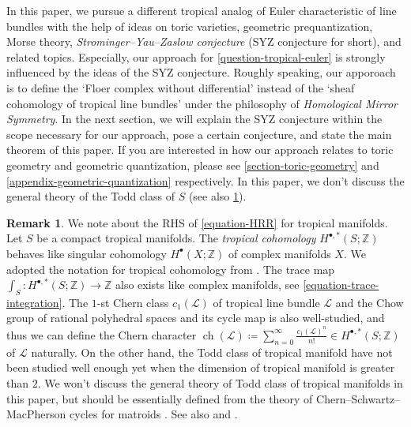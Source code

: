 \documentclass[a4paper,dvipdfmx,reqno,12pt]{amsart}
\theoremstyle{definition}
\newtheorem{remark}[theorem]{Remark}
\newcommand{\deq}{\coloneqq}
\newcommand{\opn}[1]{\operatorname{#1}}
\numberwithin{equation}{section}
\begin{document}
In this paper, we pursue a different tropical
analog of Euler characteristic of line bundles with the help of 
ideas on toric varieties, geometric prequantization,
Morse theory, \emph{Strominger--Yau--Zaslow conjecture}
(SYZ conjecture for short), and related topics.
Especially, our approach for 
\cref{question-tropical-euler} is 
strongly influenced by the ideas of the SYZ conjecture.
Roughly speaking, our apporoach is to define
the `Floer complex without differential' instead 
of the `sheaf cohomology of tropical line bundles' 
under the philosophy of \emph{Homological Mirror 
Symmetry}. 
In the next section, we will explain the SYZ conjecture 
within the scope necessary for our approach, 
pose a certain conjecture,
and state the main theorem of this paper.
If you are interested in how our approach 
relates to toric geometry and geometric quantization, 
please see \cref{section-toric-geometry} and 
\cref{appendix-geometric-quantization} respectively.
In this paper, we don't discuss the general theory of 
the Todd class of $S$
(see also \cref{remark-todd-class}).
\begin{remark}
\label{remark-todd-class}
We note about the RHS of \cref{equation-HRR} 
for tropical manifolds.
Let $S$ be a compact tropical manifolds.
The \emph{tropical cohomology}
$H^{\bullet,*}(S;\mathbb{Z})$ 
\cite{mikhalkinTropicalEigenwaveIntermediate2014a,
itenbergTropicalHomology2019b}
behaves like singular cohomology 
$H^{\bullet}(X;\mathbb{Z})$ 
of complex manifolds $X$.
We adopted the notation for tropical cohomology 
from \cite[Definition 2.6]{MR3894860}. 
The trace map 
$\int_S\colon H^{\bullet,*}(S;\mathbb{Z})
\to \mathbb{Z}$ also exists like 
complex manifolds, see 
\cref{equation-trace-integration}.  
The $1$-st Chern class $c_1(\mathcal{L})$ of 
tropical line bundle $\mathcal{L}$ and 
the Chow group of rational polyhedral spaces and 
its cycle map is also 
well-studied,
and thus we can define the Chern character
$\opn{ch}(\mathcal{L})\deq 
\sum_{n=0}^{\infty}\frac{c_1(\mathcal{L})^{n}}{n!}
\in H^{\bullet,*}(S;\mathbb{Z})$ of 
$\mathcal{L}$ naturally.
On the other hand, the Todd class of tropical manifold
have not been studied well enough yet  
when the dimension of tropical manifold is greater
than $2$.
We won't discuss the general theory of Todd class of tropical 
manifolds in this paper, 
but should be essentially defined from the theory of 
Chern--Schwartz--MacPherson cycles for matroids 
\cite[Previous work]{lopezdemedranoChernSchwartzMacPhersonCyclesMatroids2020}.
See also \cite[5.3]{mikhalkinTropicalGeometryIts2006} and
\cite[Definition 3.20]{shawTropicalSurfaces2015a}.
\end{remark}
\end{document}

